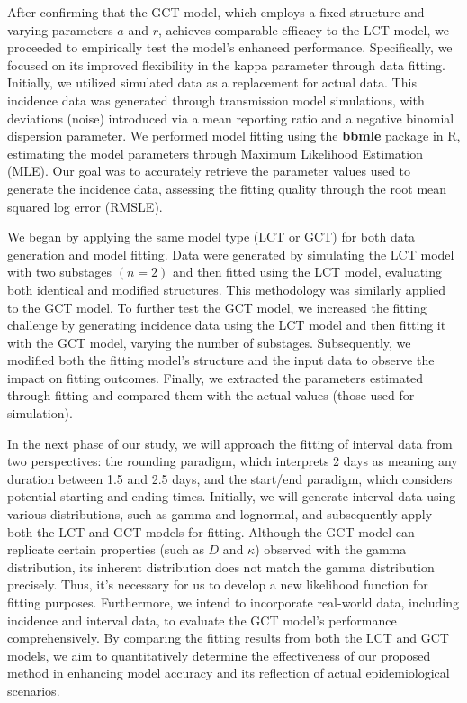 \documentclass[12pt]{article}
\begin{document}
After confirming that the GCT model, which employs a fixed structure and varying parameters $a$ and $r$, achieves comparable efficacy to the LCT model, we proceeded to empirically test the model's enhanced performance. Specifically, we focused on its improved flexibility in the kappa parameter through data fitting. Initially, we utilized simulated data as a replacement for actual data. This incidence data was generated through transmission model simulations, with deviations (noise) introduced via a mean reporting ratio and a negative binomial dispersion parameter. We performed model fitting using the \textbf{bbmle} package in R, estimating the model parameters through Maximum Likelihood Estimation (MLE). Our goal was to accurately retrieve the parameter values used to generate the incidence data, assessing the fitting quality through the root mean squared log error (RMSLE).

We began by applying the same model type (LCT or GCT) for both data generation and model fitting. Data were generated by simulating the LCT model with two substages $(n=2)$ and then fitted using the LCT model, evaluating both identical and modified structures. This methodology was similarly applied to the GCT model. To further test the GCT model, we increased the fitting challenge by generating incidence data using the LCT model and then fitting it with the GCT model, varying the number of substages. Subsequently, we modified both the fitting model's structure and the input data to observe the impact on fitting outcomes. Finally, we extracted the parameters estimated through fitting and compared them with the actual values (those used for simulation).

In the next phase of our study, we will approach the fitting of interval data from two perspectives: the rounding paradigm, which interprets 2 days as meaning any duration between 1.5 and 2.5 days, and the start/end paradigm, which considers potential starting and ending times. Initially, we will generate interval data using various distributions, such as gamma and lognormal, and subsequently apply both the LCT and GCT models for fitting. Although the GCT model can replicate certain properties (such as $D$ and $\kappa$) observed with the gamma distribution, its inherent distribution does not match the gamma distribution precisely. Thus, it's necessary for us to develop a new likelihood function for fitting purposes. Furthermore, we intend to incorporate real-world data, including incidence and interval data, to evaluate the GCT model's performance comprehensively. By comparing the fitting results from both the LCT and GCT models, we aim to quantitatively determine the effectiveness of our proposed method in enhancing model accuracy and its reflection of actual epidemiological scenarios.
\end{document}
